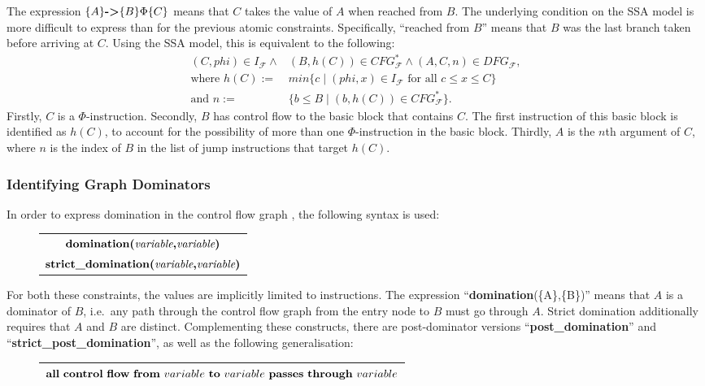     \noindent
    The expression $\{A\}\text{\bf ->}\{B\}\Phi\{C\}$ means that
    $C$ takes the value of $A$ when reached from $B$.
    The underlying condition on the SSA model is more difficult to express than
    for the previous atomic constraints.
    Specifically, ``reached from $B$'' means that $B$ was the last branch
    taken before arriving at $C$.
    Using the SSA model, this is equivalent to the following:
    \begin{align*}
        (C,phi)\in I_\mathcal F\mathrel\land{}&(B,h(C))\in CFG_\mathcal F^*\mathrel\land(A,C,n)\in DFG_\mathcal F,\\
            \text{where }h(C):={}&min\{c\mid (phi,x)\in I_\mathcal F\text{ for all }c\leq x\leq C\}\\
            \text{and }n:={}&\{b\leq B\mid (b,h(C))\in CFG_\mathcal F^*\}.
    \end{align*}
    Firstly, $C$ is a $\Phi$-instruction.
    Secondly, $B$ has control flow to the basic block that contains $C$.
    The first instruction of this basic block is identified as $h(C)$, to
    account for the possibility of more than one $\Phi$-instruction in the
    basic block.
    Thirdly, $A$ is the $n$th argument of $C$, where $n$ is the index of $B$ in
    the list of jump instructions that target $h(C)$.

\subsubsection{Identifying Graph Dominators}

    In order to express domination in the control flow graph
    \citep{Cytron:1989:AGD:73141.74823}, the following syntax is used:
\begin{figure}[h]
    \centering
    \begin{tabular}{|c|}
        \hline
        $\text{\bf domination(}\text{\it variable}\text{\bf,} \text{\it variable}\text{\bf)}$\\
        $\text{\bf strict\_domination(}\text{\it variable}\text{\bf,} \text{\it variable}\text{\bf)}$\\
        \hline
    \end{tabular}
\end{figure}

    \noindent
    For both these constraints, the values are implicitly limited to
    instructions.
    The expression ``{\bf domination}(\{A\},\{B\})'' means that $A$ is a
    dominator of $B$, i.e.\ any path through the control flow graph from the
    entry node to $B$ must go through $A$.
    Strict domination additionally requires that $A$ and $B$ are distinct.
    Complementing these constructs, there are post-dominator versions
    ``{\bf post\_domination}'' and ``{\bf strict\_post\_domination}'', as well
    as the following generalisation:
\begin{figure}[h]
    \centering
    \begin{tabular}{|c|}
        \hline
        ${\bf all}\ {\bf control}\ {\bf flow}\ {\bf from}\ variable\ {\bf to}\ variable\ {\bf passes}\ {\bf through}\ variable$\\
        \hline
    \end{tabular}
\end{figure}


